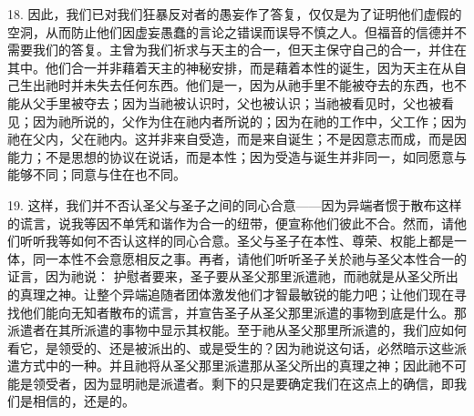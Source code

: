 18. 因此，我们已对我们狂暴反对者的愚妄作了答复，仅仅是为了证明他们虚假的空洞，从而防止他们因虚妄愚蠢的言论之错误而误导不慎之人。但福音的信德并不需要我们的答复。主曾为我们祈求与天主的合一，但天主保守自己的合一，并住在其中。他们合一并非藉着天主的神秘安排，而是藉着本性的诞生，因为天主在从自己生出祂时并未失去任何东西。他们是一，因为从祂手里不能被夺去的东西，也不能从父手里被夺去；因为当祂被认识时，父也被认识；当祂被看见时，父也被看见；因为祂所说的，父作为住在祂内者所说的；因为在祂的工作中，父工作；因为祂在父内，父在祂内。这并非来自受造，而是来自诞生；不是因意志而成，而是因能力；不是思想的协议在说话，而是本性；因为受造与诞生并非同一，如同愿意与能够不同；同意与住在也不同。\par

19. 这样，我们并不否认圣父与圣子之间的同心合意——因为异端者惯于散布这样的谎言，说我等因不单凭和谐作为合一的纽带，便宣称他们彼此不合。然而，请他们听听我等如何不否认这样的同心合意。圣父与圣子在本性、尊荣、权能上都是一体，同一本性不会意愿相反之事。再者，请他们听听圣子关於祂与圣父本性合一的证言，因为祂说： 护慰者要来，圣子要从圣父那里派遣祂，而祂就是从圣父所出的真理之神。让整个异端追随者团体激发他们才智最敏锐的能力吧；让他们现在寻找他们能向无知者散布的谎言，并宣告圣子从圣父那里派遣的事物到底是什么。那派遣者在其所派遣的事物中显示其权能。至于祂从圣父那里所派遣的，我们应如何看它，是领受的、还是被派出的、或是受生的？因为祂说这句话，必然暗示这些派遣方式中的一种。并且祂将从圣父那里派遣那从圣父所出的真理之神；因此祂不可能是领受者，因为显明祂是派遣者。剩下的只是要确定我们在这点上的确信，即我们是相信的，还是的。\par

